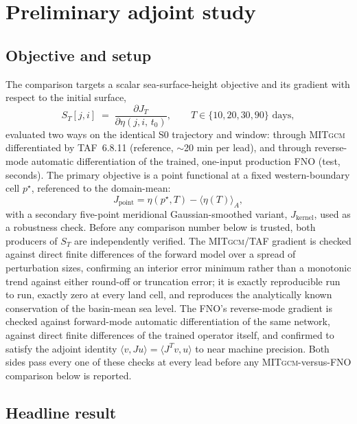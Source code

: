 \documentclass[3p,12pt]{elsarticle}
\newcommand{\MITgcm}{\textsc{MITgcm}}
\newcommand{\FNO}{FNO}
\begin{document}
\section{Preliminary adjoint study}
\label{sec:adjoint}

\subsection{Objective and setup}

The comparison targets a scalar sea-surface-height objective and its gradient
with respect to the initial surface,
\[
S_T[j,i] \;=\; \frac{\partial J_T}{\partial \eta(j,i,\,t_0)}, \qquad
T\in\{10,20,30,90\}\text{ days},
\]
evaluated two ways on the identical S0 trajectory and window: through
\MITgcm{} differentiated by TAF~6.8.11 (reference, $\sim$20 min per lead), and
through reverse-mode automatic differentiation of the trained, one-input
production \FNO{} (test, seconds). The primary objective is a point functional
at a fixed western-boundary cell $p^\star$, referenced to the domain-mean:
\[
J_{\mathrm{point}} = \eta(p^\star,T) - \langle\eta(T)\rangle_A,
\]
with a secondary five-point meridional Gaussian-smoothed variant,
$J_{\mathrm{kernel}}$, used as a robustness check. Before any comparison
number below is trusted, both producers of $S_T$ are independently verified.
The \MITgcm{}/TAF gradient is checked against direct finite differences of
the forward model over a spread of perturbation sizes, confirming an interior
error minimum rather than a monotonic trend against either round-off or
truncation error; it is exactly reproducible run to run, exactly zero at
every land cell, and reproduces the analytically known conservation of the
basin-mean sea level. The \FNO{}'s reverse-mode gradient is checked against
forward-mode automatic differentiation of the same network, against direct
finite differences of the trained operator itself, and confirmed to satisfy
the adjoint identity $\langle v,Ju\rangle=\langle J^{T}v,u\rangle$ to near
machine precision. Both sides pass every one of these checks at every lead
before any \MITgcm{}-versus-\FNO{} comparison below is reported.

\subsection{Headline result}
\end{document}
